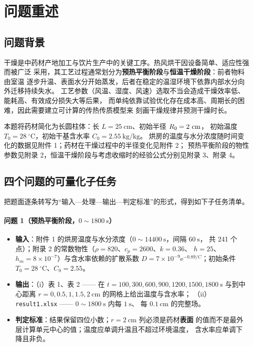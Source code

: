 \section{问题重述}

\subsection{问题背景}

干燥是中药材产地加工与饮片生产中的关键工序。热风烘干因设备简单、适应性强而被广泛
采用，其工艺过程通常划分为\textbf{预热平衡阶段}与\textbf{恒温干燥阶段}：前者物料由室温
逐步升温、表面水分开始蒸发，后者在稳定的温湿环境下依靠内部水分向外迁移持续失水。
工艺参数（风温、湿度、风速）选取不当会造成干燥效率低、能耗高、有效成分损失大等后果，
而单纯依靠试验优化存在成本高、周期长的困难，因此需要建立可计算的传热传质模型来
刻画干燥规律并预测干燥时长。

本题将药材简化为长圆柱体：长 $L=25\ \mathrm{cm}$、初始半径 $R_{0}=2\ \mathrm{cm}$，
初始温度 $T_0=28\ ^\circ\mathrm{C}$，初始干基含水率 $C_0=2.55\ \mathrm{kg/kg}$。
烘房的温度与水分浓度随时间变化的数据见附件 1；药材在干燥过程中的半径变化见附件 2；
预热平衡阶段的物性参数见附录 2，恒温干燥阶段与考虑收缩时的经验公式分别见附录 3、附录 4。

\subsection{四个问题的可量化子任务}

把题面逐条转写为“输入—处理—输出—判定标准”的形式，得到如下子任务清单。

\paragraph{问题 1（预热平衡阶段，$0\sim1800\ \mathrm{s}$）}
\begin{itemize}[leftmargin=2.2em,itemsep=0.15em]
  \item \textbf{输入}：附件 1 的烘房温度与水分浓度（$0\sim14400\ \mathrm{s}$，间隔 $60\ \mathrm{s}$，
        共 241 个点）；附录 2 的常数物性（$\rho=820$、$c_p=2600$、$k=0.36$、
        $h=25$、$h_m=8\times10^{-7}$）与含水率依赖的扩散系数
        $D=7\times10^{-9}\mathrm{e}^{-0.89/C}$；初始条件 $T_0=28\ ^\circ\mathrm{C}$、$C_0=2.55$。
  \item \textbf{输出}：（i）表 1、表 2 —— 在 $t=100,300,600,900,1200,1500,1800\ \mathrm{s}$
        与到中心距离 $r=0,0.5,1,1.5,2\ \mathrm{cm}$ 的网格上给出温度与含水率；
        （ii）\texttt{result1.xlsx} —— $0\sim1800\ \mathrm{s}$ 内每 $1\ \mathrm{s}$、
        每 $0.1\ \mathrm{cm}$ 的完整场。
  \item \textbf{判定标准}：结果保留四位小数；$r=2\ \mathrm{cm}$ 列必须是药材\textbf{表面}
        的值而不是最外层计算单元中心的值；温度应单调升温且不超过环境温度，
        含水率应单调下降且非负。
\end{itemize}

